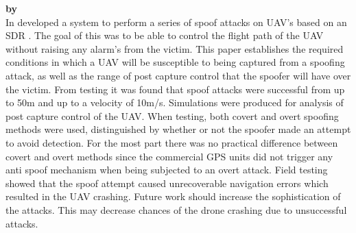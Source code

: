 \textbf{\emph{} by \citeauthor{RN21}} \\
In \citeyear{RN21} \citeauthor{RN21} \cite{RN21} developed a system to perform a series of spoof attacks on UAV's based on an SDR \cite{RN23}. The goal of this was to be able to 
control the flight path of the UAV without raising any alarm's from the victim. This paper establishes the required conditions in which a UAV will
be susceptible to being captured from a spoofing attack, as well as the range of post capture control that the spoofer will have over the victim.
From testing it was found that spoof attacks were successful from up to 50m and up to a velocity of 10m/s.
Simulations were produced for analysis of post capture control of the UAV. 
When testing, both covert and overt spoofing methods were used, distinguished by whether or not the spoofer made an attempt to avoid detection. For the most part there
was no practical difference between covert and overt methods since the commercial GPS units did not trigger any anti spoof mechanism when being subjected to an overt
attack. Field testing showed that the spoof attempt caused unrecoverable navigation errors which resulted in the UAV crashing. Future work should increase the
sophistication of the attacks. This may decrease chances of the drone crashing due to unsuccessful attacks.

\medskip


